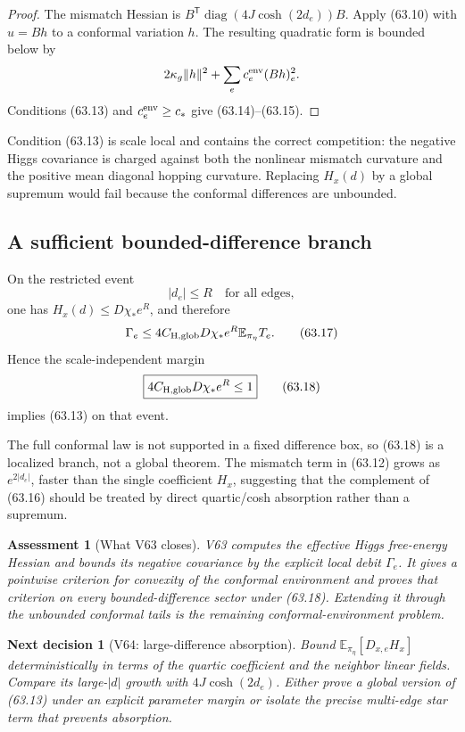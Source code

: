 \documentclass[11pt]{article}
\newtheorem{decision}[theorem]{Next decision}
\newtheorem{assessment}[theorem]{Assessment}
\theoremstyle{remark}
\begin{document}
\begin{proof}
The mismatch Hessian is
\(B^{\mathsf T}\operatorname{diag}(4J\cosh(2d_e))B\).
Apply (63.10) with \(u=Bh\) to a conformal variation \(h\).  The
resulting quadratic form is bounded below by
\[
 2\kappa_g\|h\|^2+
 \sum_ec_e^{\rm env}(Bh)_e^2.
\]
Conditions (63.13) and \(c_e^{\rm env}\geq c_*\) give
(63.14)--(63.15).
\end{proof}

Condition (63.13) is scale local and contains the correct competition:
the negative Higgs covariance is charged against both the nonlinear
mismatch curvature and the positive mean diagonal hopping curvature.
Replacing \(H_x(d)\) by a global supremum would fail because the
conformal differences are unbounded.

\subsection{A sufficient bounded-difference branch}

On the restricted event
\[
 |d_e|\leq R\quad\text{for all edges},             \tag{63.16}
\]
one has \(H_x(d)\leq D\chi_*e^R\), and therefore
\[
 \Gamma_e
 \leq
 4C_{\rm H,glob}D\chi_*e^R
 \mathbb E_{\pi_\eta}T_e.                         \tag{63.17}
\]
Hence the scale-independent margin
\[
\boxed{
 4C_{\rm H,glob}D\chi_*e^R\leq1}                 \tag{63.18}
\]
implies (63.13) on that event.

The full conformal law is not supported in a fixed difference box, so
(63.18) is a localized branch, not a global theorem.  The mismatch
term in (63.12) grows as \(e^{2|d_e|}\), faster than the single
coefficient \(H_x\), suggesting that the complement of (63.16) should
be treated by direct quartic/cosh absorption rather than a supremum.

\begin{assessment}[What V63 closes]
\label{ass:v17v63-status}
V63 computes the effective Higgs free-energy Hessian and bounds its
negative covariance by the explicit local debit \(\Gamma_e\).  It
gives a pointwise criterion for convexity of the conformal environment
and proves that criterion on every bounded-difference sector under
(63.18).  Extending it through the unbounded conformal tails is the
remaining conformal-environment problem.
\end{assessment}

\begin{decision}[V64: large-difference absorption]
\label{dec:v17v63-next}
Bound
\(\mathbb E_{\pi_\eta}[D_{x,e}H_x]\) deterministically in terms of the
quartic coefficient and the neighbor linear fields.  Compare its
large-\(|d|\) growth with \(4J\cosh(2d_e)\).  Either prove a global
version of (63.13) under an explicit parameter margin or isolate the
precise multi-edge star term that prevents absorption.
\end{decision}
\end{document}
